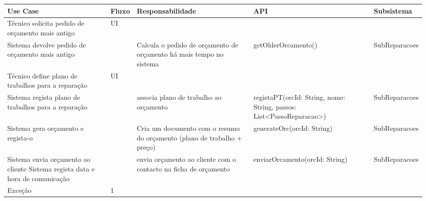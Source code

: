 \documentclass[../relatorio.tex]{subfiles}
\begin{document}
\begin{landscape}
    \begin{table}[!h]
        \centering
        \begin{tabular}{|p{5cm}|p{1cm}|p{4cm}|p{6cm}|p{3cm}|}
            \hline
            \rowcolor{gray!20!white}
            Use Case & Fluxo & Responsabilidade & API & Subsistema \\
            \hline
            \rowcolor{yellow}
            Técnico solicita pedido de orçamento mais antigo
                     & 
            UI
                     & 
                     & 
                     & 
            \\
            \hline
            Sistema devolve pedido de orçamento mais antigo
                     & 
                     & 
            Calcula o pedido de orçamento de orçamento há mais tempo no sistema
                     & 
            getOlderOrcamento()
                     & 
            SubReparacoes
            \\
            \hline
            \rowcolor{yellow}
            Técnico define plano de trabalhos para a reparação
                     & 
            UI 
                     & 
                     & 
                     & 
            \\
            \hline
            Sistema regista plano de trabalhos para a reparação
                     & 
                     & 
            associa plano de trabalho ao orçamento
                     & 
            registaPT(orcId: String, nome: String, passos: List<PassoReparacao>)
                     & 
            SubReparacoes
            \\
            \hline
            Sistema gera orçamento e regista-o
                     & 
                     & 
            Cria um documento com o resumo do orçamento (plano de trabalho + preço)
                     & 
            generateOrc(orcId: String)
                     & 
            SubReparacoes
            \\
            \hline
            Sistema envia orçamento ao cliente
            Sistema regista data e hora de comunicação
                     & 
                     & 
            envia orçamento ao cliente com o contacto na ficha de orçamento
                     & 
            enviarOrcamento(orcId: String)
                     & 
            SubReparacoes
            \\
            \hline
            \rowcolor{red!30}
            Exceção
                     & 
            1 

\end{tabular}
\end{table}
\end{landscape}
\end{document}
